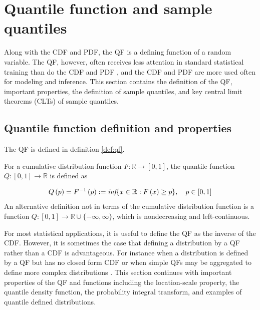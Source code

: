 \section{Quantile function and sample quantiles} \label{sec:quant_func}


Along with the CDF and PDF, the QF is a defining function of a random variable. 
The QF, however, often receives less attention in standard statistical 
training than do the CDF and PDF \cite[]{parzen2004quantile}, and the CDF and 
PDF are more used often for modeling and inference.
This section contains the definition of the QF, important properties, the 
definition of sample quantiles, and key central limit theorems (CLTs) of sample 
quantiles.

\subsection{Quantile function definition and properties}

The QF is defined in definition \ref{def:qf}.


\begin{definition}
    \label{def:qf}
    For a cumulative distribution function $F: \mathbb{R} \rightarrow 
    \left[ 0,1 \right]$, 
    the quantile function $Q: \left[0,1\right] 
    \rightarrow \mathbb{R}$ is defined as 
    
    \begin{equation*}
    \label{eq:qf}
        Q\left(p\right) = F^{-1}\left(p\right) := 
        \emph{inf}\{x \in \mathbb{R} : F\left(x\right) \geq p\}, 
        \quad p \in \left[0,1\right]
    \end{equation*}
    An alternative definition not in terms of the cumulative distribution 
    function is a function 
    $Q: \left[0,1\right] \rightarrow \mathbb{R} \cup \{-\infty, \infty\}$, which is 
    nondecreasing and left-continuous. 
\end{definition}

For most statistical applications, it is useful to define the QF as the inverse 
of the CDF. However, it is sometimes the case that defining a distribution by 
a QF rather than a CDF is advantageous. For instance when a distribution is 
defined by a 
QF but has no closed form CDF or when simple QFs may be aggregated to define 
more complex distributions 
\cite[]{perepolkin2023tenets, gasthaus2019probabilistic, alvarez2023quantile}. 
This section continues with important properties of the QF and functions 
including the location-scale property, the quantile density function, the 
probability integral transform, and examples of quantile defined distributions.


